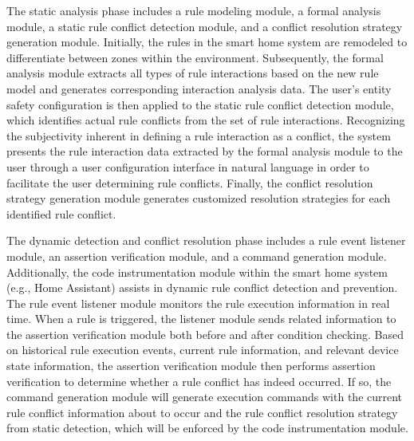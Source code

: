 The static analysis phase includes a rule modeling module, a formal analysis module, a static rule conflict detection module, and a conflict resolution strategy generation module. Initially, the rules in the smart home system are remodeled to differentiate between zones within the environment. Subsequently, the formal analysis module extracts all types of rule interactions based on the new rule model and generates corresponding interaction analysis data. The user's entity safety configuration is then applied to the static rule conflict detection module, which identifies actual rule conflicts from the set of rule interactions. Recognizing the subjectivity inherent in defining a rule interaction as a conflict, the system presents the rule interaction data extracted by the formal analysis module to the user through a user configuration interface in natural language in order to facilitate the user determining rule conflicts. Finally, the conflict resolution strategy generation module generates customized resolution strategies for each identified rule conflict.

The dynamic detection and conflict resolution phase includes a rule event listener module, an assertion verification module, and a command generation module. Additionally, the code instrumentation module within the smart home system (e.g., Home Assistant) assists in dynamic rule conflict detection and prevention. The rule event listener module monitors the rule execution information in real time. When a rule is triggered, the listener module sends related information to the assertion verification module both before and after condition checking. Based on historical rule execution events, current rule information, and relevant device state information, the assertion verification module then performs assertion verification to determine whether a rule conflict has indeed occurred. If so, the command generation module will generate execution commands with the current rule conflict information about to occur and the rule conflict resolution strategy from static detection, which will be enforced by the code instrumentation module.

